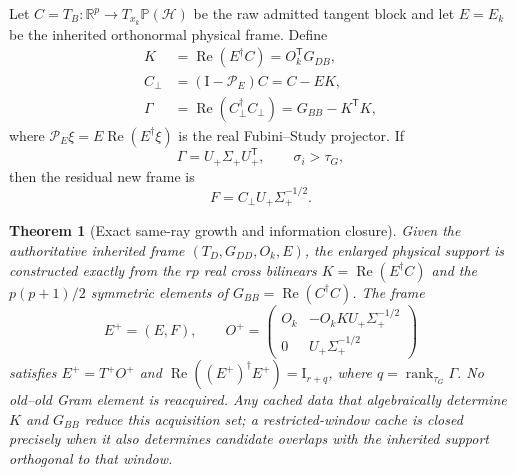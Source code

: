 \documentclass[10pt,twocolumn]{article}
\newtheorem{theorem}{Theorem}[section]
\theoremstyle{definition}
\theoremstyle{remark}
\newcommand{\R}{\mathbb R}
\newcommand{\Hh}{\mathcal H}
\newcommand{\Pj}{\mathbb P}
\newcommand{\Id}{\mathrm I}
\newcommand{\Rea}{\operatorname{Re}}
\newcommand{\rank}{\operatorname{rank}}
\begin{document}
Let $C=T_B:\R^p\to T_{x_k}\Pj(\Hh)$ be the raw admitted tangent block and let $E=E_k$ be the inherited orthonormal physical frame.  Define
\begin{align}
 K&=\Rea(E^\dagger C)=O_k^{\mathsf T}G_{DB},\nonumber\\
 C_\perp&=(\Id-\mathcal P_E)C=C-EK,\nonumber\\
 \Gamma&=\Rea(C_\perp^\dagger C_\perp)
 =G_{BB}-K^{\mathsf T}K,
 \label{eq:residualgrowth}
\end{align}
where $\mathcal P_E\xi=E\Rea(E^\dagger\xi)$ is the real Fubini--Study projector.  If
\begin{equation}
 \Gamma=U_+\Sigma_+U_+^{\mathsf T},\qquad \sigma_i>\tau_G,
 \label{eq:gammaeig}
\end{equation}
then the residual new frame is
\begin{equation}
 F=C_\perp U_+\Sigma_+^{-1/2}.
 \label{eq:newframe}
\end{equation}

\begin{theorem}[Exact same-ray growth and information closure]
Given the authoritative inherited frame $(T_D,G_{DD},O_k,E)$, the enlarged physical support is constructed exactly from the $rp$ real cross bilinears $K=\Rea(E^\dagger C)$ and the $p(p+1)/2$ symmetric elements of $G_{BB}=\Rea(C^\dagger C)$.  The frame
\begin{equation}
 E^+=(E,F),\qquad
 O^+=
 \begin{pmatrix}
 O_k&-O_kKU_+\Sigma_+^{-1/2}\\
 0&U_+\Sigma_+^{-1/2}
 \end{pmatrix}
 \label{eq:extendedwhitener}
\end{equation}
satisfies $E^+=T^+O^+$ and $\Rea((E^+)^\dagger E^+)=\Id_{r+q}$, where $q=\rank_{\tau_G}\Gamma$.  No old--old Gram element is reacquired.  Any cached data that algebraically determine $K$ and $G_{BB}$ reduce this acquisition set; a restricted-window cache is closed precisely when it also determines candidate overlaps with the inherited support orthogonal to that window.
\end{theorem}
\end{document}
